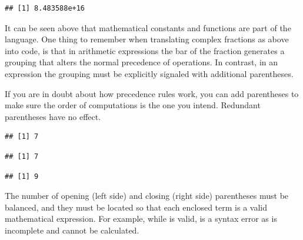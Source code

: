 \documentclass[krantz2]{krantz}\usepackage{knitr}
\begin{document}
\begin{knitrout}\footnotesize
{}\color{fgcolor}\begin{kframe}
\begin{alltt}
\hlstd{(} \hlopt{+} \hlstd{(}\hlstd{))} \hlopt{/} 
\end{alltt}
\begin{verbatim}
## [1] 8.483588e+16
\end{verbatim}
\end{kframe}
\end{knitrout}

It can be seen above that mathematical constants and functions are part of the \Rlang language. One thing to remember when translating complex fractions as above into \Rlang code, is that in arithmetic expressions the bar of the fraction generates a grouping that alters the normal precedence of operations. In contrast, in an \Rlang expression the grouping must be explicitly signaled with additional parentheses.

If you are in doubt about how precedence rules work, you can add parentheses to make sure the order of computations is the one you intend. Redundant parentheses have no effect.

\begin{knitrout}\footnotesize
{}\color{fgcolor}\begin{kframe}
\begin{alltt}
 \hlopt{+}  \hlopt{*} 
\end{alltt}
\begin{verbatim}
## [1] 7
\end{verbatim}
\begin{alltt}
 \hlopt{+} \hlstd{(} \hlopt{*} \hlstd{)}
\end{alltt}
\begin{verbatim}
## [1] 7
\end{verbatim}
\begin{alltt}
\hlstd{(} \hlopt{+} \hlstd{)} \hlopt{*} 
\end{alltt}
\begin{verbatim}
## [1] 9
\end{verbatim}
\end{kframe}
\end{knitrout}

The number of opening (left side) and closing (right side) parentheses must be balanced, and they must be located so that each enclosed term is a valid mathematical expression. For example, while  is valid,  is a syntax error as  is incomplete and cannot be calculated.
\end{document}
